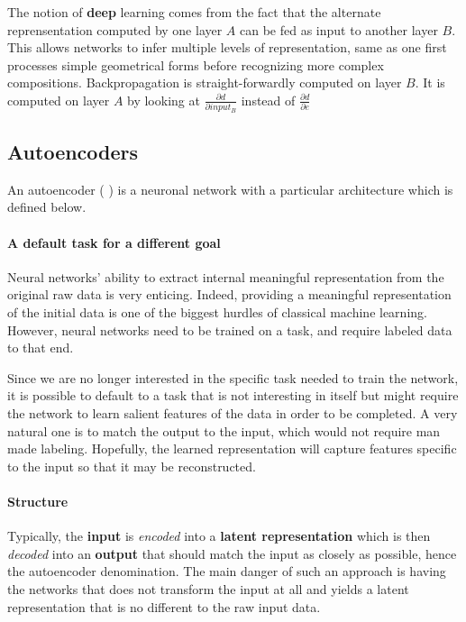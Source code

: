 \documentclass[conference]{IEEEtran}
\begin{document}
The notion of \textbf{deep} learning comes from the fact that the alternate
reprensentation computed by one layer $A$ can be fed as input to another layer $B$.
This allows networks to infer multiple levels of representation, same as one
first processes simple geometrical forms before recognizing more complex
compositions. Backpropagation is straight-forwardly computed on layer $B$. It is
computed on layer $A$ by looking at $\frac{\partial d}{\partial input_B}$
instead of $\frac{\partial d}{\partial e}$
\subsection{Autoencoders}

An autoencoder (\cite{Hinton504}
) is a neuronal network with a particular architecture which is defined below.

\paragraph{A default task for a different goal}

Neural networks' ability to extract internal meaningful representation from the
original raw data is very enticing. Indeed, providing a meaningful
representation of the initial data is one of the biggest hurdles of classical
machine learning. However, neural networks need to be trained on a task, and
require labeled data to that end. 

Since we are no longer interested in the specific task needed to train the
network, it is possible to default to a task that is not interesting in itself
but might require the network to learn salient features of the data in order to
be completed. A very natural one is to match the output to the input, which
would not require man made labeling. Hopefully, the learned representation will
capture features specific to the input so that it may be reconstructed.

\paragraph{Structure}

Typically, the \textbf{input} is \textit{encoded} into a \textbf{latent
  representation} which is then \textit{decoded} into an \textbf{output} that
should match the input as closely as possible, hence the autoencoder
denomination. The main danger of such an approach is having the networks that
does not transform the input at all and yields a latent representation that is
no different to the raw input data. 
\end{document}
